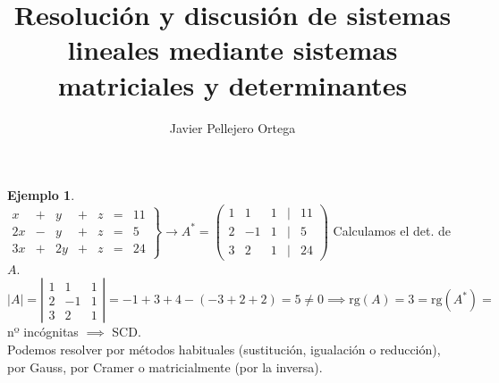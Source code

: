 \documentclass[11pt, oneside]{book}
\title{Resolución y discusión de sistemas lineales mediante sistemas matriciales y determinantes}
\author{Javier Pellejero Ortega}
\theoremstyle{definition} %
\newtheorem{ejem}{Ejemplo}
\newcommand{\deter}[1]{\left| \begin{matrix} #1	\end{matrix}\right|}
\newcommand{\triple}[3]{ \left. \begin{array}{ll}	#1 \\#2 \\#3\\	\end{array} 	\right. }
\newcommand{\rg}{\mathrm{rg}}
\begin{document}
\begin{ejem}\ \\
$\left. \begin{matrix} x & + & y & + & z & = &11\\
2x & - & y & + & z & = &5\\
3x & + & 2y & + & z & = &24 \end{matrix}\right\}\longrightarrow A^*= \begin{pmatrix} 1&1&1&|&11\\2&-1&1&|&5\\3&2&1&|&24\end{pmatrix}$ Calculamos el det. de $A$.\\
$|A|=\deter{1&1&1\\2&-1&1\\3&2&1}=-1+3+4-(-3+2+2)=5\neq 0\implies \rg(A)=3=\rg(A^*)=$ nº incógnitas $\implies$ SCD.\\
Podemos resolver por métodos habituales (sustitución, igualación o reducción), por Gauss, por Cramer o matricialmente (por la inversa).
\end{ejem}
\end{document}
